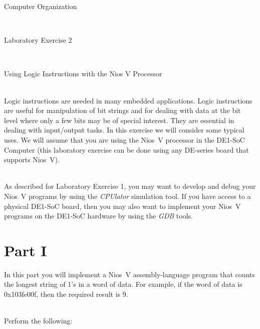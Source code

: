 \documentclass[epsfig,10pt,fullpage]{article}
\newcommand{\LabNum}{2}
\begin{document}
\centerline{\huge Computer Organization}
~\\
\centerline{\huge Laboratory Exercise \LabNum}
~\\
\centerline{\large Using Logic Instructions with the Nios\textsuperscript{\textregistered} V Processor}
~\\

Logic instructions are needed in many embedded applications.  Logic instructions are useful 
for manipulation of bit strings and for dealing with data at the bit level where only a 
few bits may be of special interest. They are essential in dealing with input/output tasks.
In this exercise we will consider some typical uses. We will assume that you are using the 
Nios\textsuperscript{\textregistered}~V processor in the DE1-SoC Computer (this
laboratory exercise can be done using any DE-series board that supports Nios~V).

~\\
As described for Laboratory Exercise 1, you may want to develop and debug your Nios~V
programs by using the {\it CPUlator} simulation tool. If you have access to a physical DE1-SoC
board, then you may also want to implement your Nios~V programs on the DE1-SoC hardware by 
using the {\it GDB} tools. 

\section*{Part I}
In this part you will implement a Nios~V assembly-language program that counts the longest 
string of 1's in a word of data. For example, if the word of data is {\sf 0x103fe00f}, then 
the required result is 9.

~\\
Perform the following:
\end{document}
